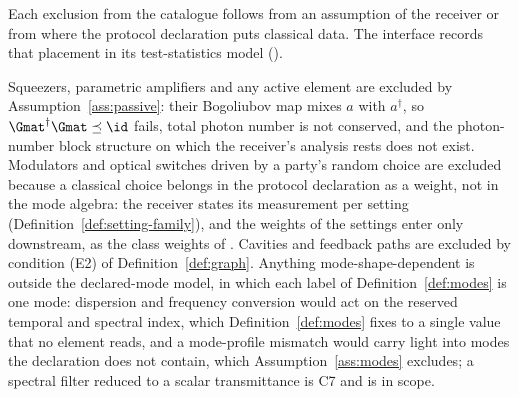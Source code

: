 
Each exclusion from the catalogue follows from an assumption of the receiver
or from where the protocol declaration puts classical data. The interface records that placement in its
test-statistics model ().

\begin{remark}\label{rem:out}
Squeezers, parametric amplifiers and any active element are excluded by
Assumption~\ref{ass:passive}: their Bogoliubov map mixes $a$ with
$a^\dagger$, so $\Gmat^\dagger\Gmat\preceq\id$ fails, total photon number is
not conserved, and the photon-number block structure on which the receiver's
analysis rests does not exist. Modulators and optical switches driven by a
party's random choice are excluded because a classical choice belongs in the
protocol declaration as a weight, not in the mode algebra: the receiver
states its measurement per setting (Definition~\ref{def:setting-family}), and
the weights of the settings enter only downstream, as the class weights of
. Cavities and feedback paths are excluded by
condition (E2) of Definition~\ref{def:graph}. Anything mode-shape-dependent is outside the
declared-mode model, in which each label of Definition~\ref{def:modes} is one
mode: dispersion and frequency conversion would act on the reserved temporal
and spectral index, which Definition~\ref{def:modes} fixes to a single value
that no element reads, and a mode-profile mismatch would carry light into
modes the declaration does not contain, which Assumption~\ref{ass:modes}
excludes; a spectral filter reduced to a scalar transmittance is C7 and is in
scope.
\end{remark}
